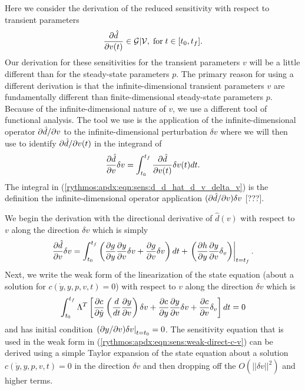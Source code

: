 \documentclass[pdf,ps2pdf,11pt]{SANDreport}
\begin{document}
Here we consider the derivation of the reduced sensitivity with respect to
transient parameters
%
\begin{equation}
\displaystyle{\frac{\partial \hat{d}}{\partial v(t)}} \in \mathcal{G}|\mathcal{V}, \; \mbox{for} \; t\in[t_0,t_f].
\end{equation}
%
Our derivation for these sensitivities for the transient parameters $v$ will
be a little different than for the steady-state parameters $p$.  The primary
reason for using a different derivation is that the infinite-dimensional
transient parameters $v$ are fundamentally different than finite-dimensional
steady-state parameters $p$.  Because of the infinite-dimensional nature of
$v$, we use a different tool of functional analysis.  The tool we use is the
application of the infinite-dimensional operator $\partial \hat{d} / \partial v$ to the
infinite-dimensional perturbation $\delta v$ where we will then use to
identify $\partial \hat{d} / \partial v(t)$ in the integrand of
%
\begin{equation}
\displaystyle{\frac{\partial \hat{d}}{\partial v}} \delta v = \int_{t_0}^{t_f} \displaystyle{\frac{\partial \hat{d}}{\partial v(t)}} \delta v(t) dt.
\label{rythmos:apdx:eqn:sens:d_d_hat_d_v_delta_v}
\end{equation}
%
The integral in (\ref{rythmos:apdx:eqn:sens:d_d_hat_d_v_delta_v}) is the
definition the infinite-dimensional operator application $(\partial \hat{d} / \partial v)
{}\delta v$ [???].

We begin the derivation with the directional derivative of $\hat{d}(v)$ with
respect to $v$ along the direction $\delta v$ which is simply
%
\begin{equation}
\displaystyle{\frac{\partial \hat{d}}{\partial v}} \delta v
= \int_{t_0}^{t_f} \left( \displaystyle{\frac{\partial g}{\partial y}} \displaystyle{\frac{\partial y}{\partial v}} \delta v +  \displaystyle{\frac{\partial g}{\partial v}} \delta v \right) dt
+ \left. \left(  \displaystyle{\frac{\partial h}{\partial y}} \displaystyle{\frac{\partial y}{\partial v}} \delta_v \right) \right|_{t=t_f}.
\label{rythmos:apdx:eqn:sens:d_d_hat_d_v_delta_v-2}
\end{equation}
%
Next, we write the weak form of the linearization of the state equation (about
a solution for $c(\dot{y},y,p,v,t)=0$) with respect to $v$ along the direction
$\delta v$ which is
%
\begin{equation}
%
\int_{t_0}^{t_f} \Lambda^T \left[
\Jac{c}{\dot{y}} \left(\frac{d}{dt} \Jac{y}{v} \right) \delta v + \Jac{c}{y} \Jac{y}{v} \delta v
+ \Jac{c}{v} \delta_v \right] dt = 0
\label{rythmos:apdx:eqn:sens:weak-direct-c-v}
\end{equation}
%
and has initial condition $\left.(\partial y / \partial v)\delta v\right|_{t=t_0} = 0$.
The sensitivity equation that is used in the weak form in
(\ref{rythmos:apdx:eqn:sens:weak-direct-c-v}) can be derived using a simple
Taylor expansion of the state equation about a solution $c(\dot{y},y,p,v,t)=0$
in the direction $\delta v$ and then dropping off the $O(||\delta v||^2)$ and
higher terms.
\end{document}
